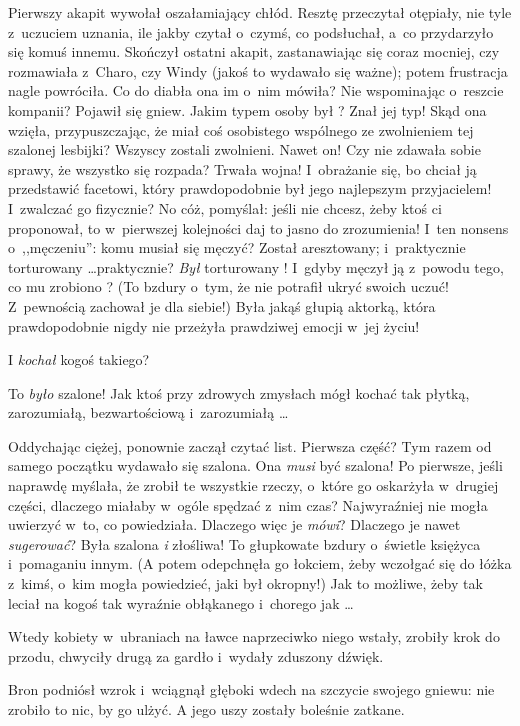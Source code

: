 \documentclass[oneside,polish,11pt,rmheadings]{mwbk}
\begin{document}
Pierwszy akapit wywołał oszałamiający chłód. Resztę przeczytał otępiały, nie tyle z~uczuciem uznania, ile jakby czytał o~czymś, co podsłuchał, a~co przydarzyło się komuś innemu. Skończył ostatni akapit, zastanawiając się coraz mocniej, czy rozmawiała z~Charo, czy Windy (jakoś to wydawało się ważne); potem frustracja nagle powróciła. Co do diabła ona im o~nim mówiła? Nie wspominając o~reszcie kompanii? Pojawił się gniew. Jakim typem osoby był ? Znał jej typ! Skąd ona wzięła, przypuszczając, że miał coś osobistego wspólnego ze zwolnieniem tej szalonej lesbijki? Wszyscy zostali zwolnieni. Nawet on! Czy nie zdawała sobie sprawy, że wszystko się rozpada? Trwała wojna! I~obrażanie się, bo chciał ją przedstawić facetowi, który prawdopodobnie był jego najlepszym przyjacielem! I~zwalczać go fizycznie? No cóż, pomyślał: jeśli nie chcesz, żeby ktoś ci proponował, to w~pierwszej kolejności daj to jasno do zrozumienia! I~ten nonsens o~,,męczeniu'': komu musiał się męczyć? Został aresztowany; i~praktycznie torturowany  \ldots  praktycznie? \textit{Był }torturowany ! I~gdyby męczył ją z~powodu tego, co mu zrobiono ? (To bzdury o~tym, że nie potrafił ukryć swoich uczuć! Z~pewnością zachował je dla siebie!) Była jakąś głupią aktorką, która prawdopodobnie nigdy nie przeżyła prawdziwej emocji w~jej życiu! 

I \textit{kochał }kogoś takiego? 

To \textit{było }szalone! Jak ktoś przy zdrowych zmysłach mógł kochać tak płytką, zarozumiałą, bezwartościową i~zarozumiałą \ldots  

Oddychając ciężej, ponownie zaczął czytać list. Pierwsza część? Tym razem od samego początku wydawało się szalona. Ona \textit{musi }być szalona! Po pierwsze, jeśli naprawdę myślała, że zrobił te wszystkie rzeczy, o~które go oskarżyła w~drugiej części, dlaczego miałaby w~ogóle spędzać z~nim czas? Najwyraźniej nie mogła uwierzyć w~to, co powiedziała. Dlaczego więc je \textit{mówi}? Dlaczego je nawet \textit{sugerować}? Była szalona \textit{i} złośliwa! To głupkowate bzdury o~świetle księżyca i~pomaganiu innym. (A potem odepchnęła go łokciem, żeby wczołgać się do łóżka z~kimś, o~kim mogła powiedzieć, jaki był okropny!) Jak to możliwe, żeby tak leciał na kogoś tak wyraźnie obłąkanego i~chorego jak \ldots  

Wtedy kobiety w~ubraniach na ławce naprzeciwko niego wstały, zrobiły krok do przodu, chwyciły drugą za gardło i~wydały zduszony dźwięk. 

Bron podniósł wzrok i~wciągnął głęboki wdech na szczycie swojego gniewu: nie zrobiło to nic, by go ulżyć. A jego uszy zostały boleśnie zatkane. 
\end{document}
